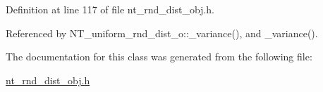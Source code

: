 Definition at line 117 of file nt\_\-rnd\_\-dist\_\-obj.h.



Referenced by NT\_\-uniform\_\-rnd\_\-dist\_\-o::\_\-variance(), and \_\-variance().



The documentation for this class was generated from the following file:\begin{DoxyCompactItemize}
\item 
\hyperlink{nt__rnd__dist__obj_8h}{nt\_\-rnd\_\-dist\_\-obj.h}\end{DoxyCompactItemize}
